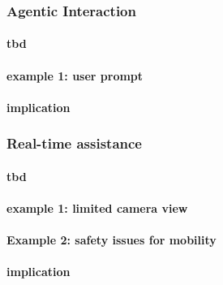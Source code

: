 \subsubsection{Agentic Interaction}

\paragraph{tbd}


\paragraph{example 1: user prompt}

\paragraph{implication}


\subsubsection{Real-time assistance}



\paragraph{tbd}

\paragraph{example 1: limited camera view}

\paragraph{Example 2: safety issues for mobility}


\paragraph{implication}


